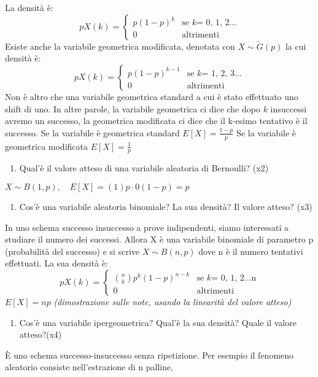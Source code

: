 La densità è:
\[pX(k)= \begin{cases} p(1 - p)^{k} & \mbox{se } k\mbox{= 0, 1, 2...} \\ 0 & \mbox{altrimenti } \end{cases} \]
Esiste anche la variabile geometrica modificata, denotata con $X \sim \tilde{G}(p)$ la cui densità è:
\[pX(k)= \begin{cases} p(1 - p)^{k-1} & \mbox{se } k\mbox{= 1, 2, 3...} \\ 0 & \mbox{altrimenti } \end{cases} \]
Non è altro che una variabile geometrica standard a cui è stato effettuato uno shift di uno.\newline
In altre parole, la variabile geometrica ci dice che dopo $k$ insuccessi avremo un successo, la geometrica modificata ci dice che il k-esimo tentativo è il successo.\newline
Se la variabile è geometrica standard $E[X] = \frac{1-p}{p}$\newline
Se la variabile è geometrica modificata $E[X] = \frac{1}{p}$
\begin{enumerate}[resume]\bfseries
	\item Qual'è il valore atteso di una variabile aleatoria di Bernoulli? (x2)
\end{enumerate}
$X \sim B(1,p), \quad E[X] = (1)p \cdot 0(1-p) = p$
\begin{enumerate}[resume]\bfseries
\item Cos'è una variabile aleatoria binomiale? La sua densità? Il valore atteso? (x3)
\end{enumerate}
In uno schema successo insuccesso a prove indipendenti, siamo interessati a studiare il numero dei successi.
Allora X è una variabile binomiale di parametro p (probabilità del successo) e si scrive $X \sim B(n,p)$ dove n è il numero tentativi effettuati. La sua densità è:
\[pX(k)= \begin{cases} \binom{n}{k}p^{k}(1-p)^{n-k}& \mbox{se } k\mbox{= 0, 1, 2...n} \\ 0 & \mbox{altrimenti } \end{cases} \]
$E[X] = np$ \textit{(dimostrazione sulle note, usando la linearità del valore atteso)}
\begin{enumerate}[resume]\bfseries
\item  Cos'è una variabile ipergeometrica? Qual'è la sua densità? Quale il valore atteso?(x4)
\end{enumerate}
È uno schema successo-insuccesso senza ripetizione. Per esempio il fenomeno aleatorio consiste nell’estrazione di n palline,
